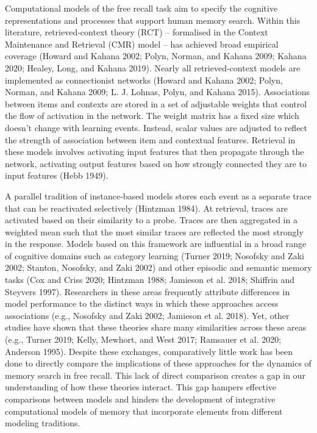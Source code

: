 \documentclass[
  letterpaper,
  11pt,
  english,
  singlespacing,
  headsepline]{MastersDoctoralThesis}
\begin{document}
Computational models of the free recall task aim to specify the
cognitive representations and processes that support human memory
search. Within this literature, retrieved‑context theory (RCT) --
formalised in the Context Maintenance and Retrieval (CMR) model -- has
achieved broad empirical coverage (Howard and Kahana 2002; Polyn,
Norman, and Kahana 2009; Kahana 2020; Healey, Long, and Kahana 2019).
Nearly all retrieved-context models are implemented as connectionist
networks (Howard and Kahana 2002; Polyn, Norman, and Kahana 2009; L. J.
Lohnas, Polyn, and Kahana 2015). Associations between items and contexts
are stored in a set of adjustable weights that control the flow of
activation in the network. The weight matrix has a fixed size which
doesn't change with learning events. Instead, scalar values are adjusted
to reflect the strength of association between item and contextual
features. Retrieval in these models involves activating input features
that then propagate through the network, activating output features
based on how strongly connected they are to input features (Hebb 1949).

A parallel tradition of instance‑based models stores each event as a
separate trace that can be reactivated selectively (Hintzman 1984). At
retrieval, traces are activated based on their similarity to a probe.
Traces are then aggregated in a weighted mean such that the most similar
traces are reflected the most strongly in the response. Models based on
this framework are influential in a broad range of cognitive domains
such as category learning (Turner 2019; Nosofsky and Zaki 2002; Stanton,
Nosofsky, and Zaki 2002) and other episodic and semantic memory tasks
(Cox and Criss 2020; Hintzman 1988; Jamieson et al. 2018; Shiffrin and
Steyvers 1997). Researchers in these areas frequently attribute
differences in model performance to the distinct ways in which these
approaches access associations (e.g., Nosofsky and Zaki 2002; Jamieson
et al. 2018). Yet, other studies have shown that these theories share
many similarities across these areas (e.g., Turner 2019; Kelly, Mewhort,
and West 2017; Ramsauer et al. 2020; Anderson 1995). Despite these
exchanges, comparatively little work has been done to directly compare
the implications of these approaches for the dynamics of memory search
in free recall. This lack of direct comparison creates a gap in our
understanding of how these theories interact. This gap hampers effective
comparisons between models and hinders the development of integrative
computational models of memory that incorporate elements from different
modeling traditions.
\end{document}
